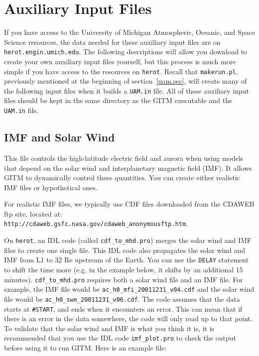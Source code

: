
\section{Auxiliary Input Files}
\label{aux.sec}

If you have access to the University of Michigan Atmospheric, Oceanic, and Space Science resources, the data needed for these auxiliary input files are on {\tt herot.engin.umich.edu}.  The following descriptions will allow you download to create your own auxiliary input files yourself, but this process is much more simple if you have access to the resources on {\tt herot}.  Recall that {\tt makerun.pl}, previously mentioned at the beginning of section~\ref{uam.sec}, will create many of the following input files when it builds a {\tt UAM.in} file.  All of these auxiliary input files should be kept in the same directory as the GITM executable and the {\tt UAM.in} file.

\subsection{IMF and Solar Wind}
\label{imf.sec}

This file controls the high-latitude electric field and aurora when using models that depend on the solar wind and interplanetary magnetic field (IMF).  It allows GITM to dynamically control these quantities.  You can create either realistic IMF files or hypothetical ones.

For realistic IMF files, we typically use CDF files downloaded from the CDAWEB ftp site, located at:\\{\tt http://cdaweb.gsfc.nasa.gov/cdaweb\_anonymousftp.htm}.

On {\tt herot}, an IDL code (called {\tt cdf\_to\_mhd.pro}) merges the solar wind and IMF files to create one single file.  This IDL code also propagates the solar wind and IMF from L1 to 32 Re upstream of the Earth.  You can use the {\tt DELAY} statement to shift the time more (e.g. in the example below, it shifts by an additional 15 minutes).  {\tt cdf\_to\_mhd.pro} requires both a solar wind file and an IMF file. For example, the IMF file would be {\tt ac\_h0\_mfi\_20011231\_v04.cdf} and the solar wind file would be {\tt ac\_h0\_swe\_20011231\_v06.cdf}.  The code assumes that the data starts at {\tt \#START}, and ends when it encounters an error.  This can mean that if there is an error in the data somewhere, the code will only read up to that point.  To validate that the solar wind and IMF is what you think it is, it is recommended that you use the IDL code {\tt imf\_plot.pro} to check the output before using it to run GITM.  Here is an example file:

